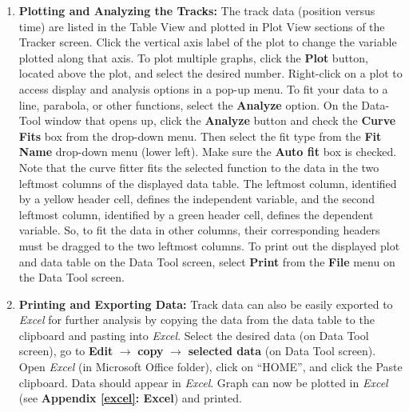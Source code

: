 \begin{enumerate}
\item {\bf Plotting and Analyzing the Tracks:} The track data (position versus time) are listed in the Table View and plotted in Plot View sections of the Tracker screen. Click the vertical axis label of the plot to change the variable plotted along that axis. To plot multiple graphs, click the {\bf Plot} button, located above the plot, and select the desired number. 
Right-click on a plot to access display and analysis options in a pop-up menu. To fit your data to a line, parabola, or other functions, select the {\bf Analyze} option. On the Data-Tool window that opens up, click the {\bf Analyze} button and check the {\bf Curve Fits} box from the drop-down menu. Then select the fit type from the {\bf Fit Name} drop-down menu (lower left). Make sure the {\bf Auto fit} box is checked. 
Note that the curve fitter fits the selected function to the data in the two leftmost columns of the displayed data table. The leftmost column, identified by a yellow header cell, defines the independent variable, and the second leftmost column, identified by a green header cell, defines the dependent variable. So, to fit the data in other columns, their corresponding headers must be dragged to the two leftmost columns. To print out the displayed plot and data table on the Data Tool screen, select {\bf Print} from the {\bf File} menu on the Data Tool screen.

\item {\bf Printing and Exporting Data:} Track data can also be easily exported to \textit{Excel} for further analysis by copying the data from the data table to the clipboard and pasting into \textit{Excel}. 
Select the desired data (on Data Tool screen), go to {\bf Edit} $\rightarrow$ {\bf copy} $\rightarrow$ {\bf selected data} (on Data Tool screen). 
Open \textit{Excel} (in Microsoft Office folder), click on ``HOME'', and click the Paste clipboard. Data should appear in \textit{Excel}. Graph can now be plotted in \textit{Excel} (see \textbf{Appendix \ref{excel}: Excel}) and printed.

\end{enumerate} 

